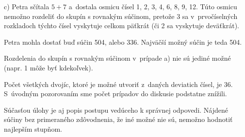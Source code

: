 {\medskip
\noindent
c) Petra sčítala $5+7$ a~dostala osmicu čísel 1, 2, 3, 4, 6, 8, 9, 12.
Túto osmicu nemožno rozdeliť do skupín s rovnakým súčinom,
pretože 3 sa v~prvočíselných rozkladoch týchto čísel vyskytuje celkom päťkrát (či 2 sa vyskytuje deväťkrát).

\medskip
Petra mohla dostať buď súčin 504, alebo 336.
Najväčší možný súčin je teda 504.

\poznamky
Rozdelenia do skupín s rovnakým súčinom v~prípade a) nie sú jediné možné (napr. 1 môže byť kdekoľvek).

Počet všetkých dvojíc, ktoré je možné utvoriť z~daných deviatich čísel, je 36.
S~úvodným pozorovaním sme počet prípadov do diskusie podstatne znížili.

Súčasťou úlohy je aj popis postupu vedúceho k správnej odpovedi.
Nájdené súčiny bez primeraného zdôvodnenia, že iné možné nie sú, nemožno hodnotiť najlepším stupňom.}

